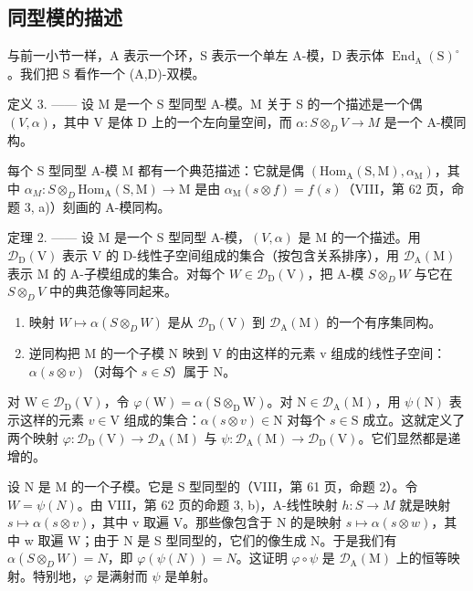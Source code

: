 \subsection{同型模的描述}

与前一小节一样，A 表示一个环，S 表示一个单左 A-模，D 表示体 \(\operatorname{End}_{\mathrm{A}}(\mathrm{S})^{\circ}\)。我们把 S 看作一个 (A,D)-双模。

定义 3. —— 设 M 是一个 S 型同型 A-模。M 关于 S 的一个描述是一个偶 \((V, \alpha)\)，其中 V 是体 D 上的一个左向量空间，而 \(\alpha : S \otimes_{D} V \to M\) 是一个 A-模同构。

每个 S 型同型 A-模 M 都有一个典范描述：它就是偶 \((\mathrm{Hom}_{\mathrm{A}}(\mathrm{S},\mathrm{M}),\alpha_{\mathrm{M}})\)，其中 \(\alpha_{M}:S\otimes_{D}\mathrm{Hom}_{\mathrm{A}}(\mathrm{S},\mathrm{M})\to\mathrm{M}\) 是由 \(\alpha_{\mathrm{M}}(s\otimes f)=f(s)\)（VIII，第 62 页，命题 3, a)）刻画的 A-模同构。

定理 2. —— 设 M 是一个 S 型同型 A-模，\((V,\alpha)\) 是 M 的一个描述。用 \(\mathcal{D}_{\mathrm{D}}(\mathrm{V})\) 表示 V 的 D-线性子空间组成的集合（按包含关系排序），用 \(\mathcal{D}_{\mathrm{A}}(\mathrm{M})\) 表示 M 的 A-子模组成的集合。对每个 \(W \in \mathcal{D}_{\mathrm{D}}(\mathrm{V})\)，把 A-模 \(S \otimes_{D} W\) 与它在 \(S \otimes_{D} V\) 中的典范像等同起来。

\begin{enumerate}
\def\labelenumi{\alph{enumi})}
\item
  映射 \(W \mapsto \alpha(S \otimes_{D} W)\) 是从 \(\mathcal{D}_{\mathrm{D}}(\mathrm{V})\) 到 \(\mathcal{D}_{\mathrm{A}}(\mathrm{M})\) 的一个有序集同构。
\item
  逆同构把 M 的一个子模 N 映到 V 的由这样的元素 v 组成的线性子空间：\(\alpha(s \otimes v)\)（对每个 \(s \in S\)）属于 N。
\end{enumerate}

对 \(\mathrm{W} \in \mathcal{D}_{\mathrm{D}}(\mathrm{V})\)，令 \(\varphi(\mathrm{W}) = \alpha(\mathrm{S} \otimes_{\mathrm{D}} \mathrm{W})\)。对 \(\mathrm{N} \in \mathcal{D}_{\mathrm{A}}(\mathrm{M})\)，用 \(\psi(\mathrm{N})\) 表示这样的元素 \(v \in \mathrm{V}\) 组成的集合：\(\alpha(s \otimes v) \in \mathrm{N}\) 对每个 \(s \in \mathrm{S}\) 成立。这就定义了两个映射 \(\varphi: \mathcal{D}_{\mathrm{D}}(\mathrm{V}) \to \mathcal{D}_{\mathrm{A}}(\mathrm{M})\) 与 \(\psi: \mathcal{D}_{\mathrm{A}}(\mathrm{M}) \to \mathcal{D}_{\mathrm{D}}(\mathrm{V})\)。它们显然都是递增的。

设 N 是 M 的一个子模。它是 S 型同型的（VIII，第 61 页，命题 2）。令 \(W = \psi(N)\)。由 VIII，第 62 页的命题 3, b)，A-线性映射 \(h : S \to M\) 就是映射 \(s \mapsto \alpha(s \otimes v)\)，其中 v 取遍 V。那些像包含于 N 的是映射 \(s \mapsto \alpha(s \otimes w)\)，其中 w 取遍 W；由于 N 是 S 型同型的，它们的像生成 N。于是我们有 \(\alpha(S \otimes_{D} W) = N\)，即 \(\varphi(\psi(N)) = N\)。这证明 \(\varphi \circ \psi\) 是 \(\mathcal{D}_{\mathrm{A}}(\mathrm{M})\) 上的恒等映射。特别地，\(\varphi\) 是满射而 \(\psi\) 是单射。

